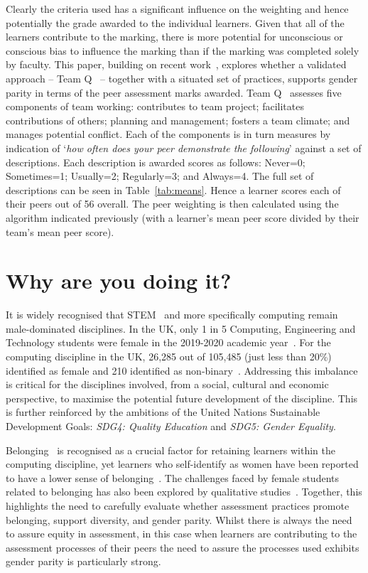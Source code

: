 \documentclass[sigconf, anonymous=false]{acmart}
\begin{document}
Clearly the criteria used has a significant influence on the weighting
and hence potentially the grade awarded to the individual
learners. Given that all of the learners contribute to the marking,
there is more potential for unconscious or conscious bias to influence
the marking than if the marking was completed solely by faculty. This
paper, building on recent
work~\cite{crick-et-alassessposter:sigcse2022}, explores whether a
validated approach -- Team Q~\cite{Britton2017} -- together with a
situated set of practices, supports gender parity in terms of the peer
assessment marks awarded.  Team Q~\cite{Britton2017} assesses five
components of team working: contributes to team project; facilitates
contributions of others; planning and management; fosters a team
climate; and manages potential conflict. Each of the components is in
turn measures by indication of `{\emph{how often does your peer
demonstrate the following}}' against a set of descriptions. Each
description is awarded scores as follows: Never=0; Sometimes=1;
Usually=2; Regularly=3; and Always=4. The full set of descriptions can
be seen in Table~\ref{tab:means}. Hence a learner scores each of their
peers out of 56 overall. The peer weighting is then calculated using
the algorithm indicated previously (with a learner's mean peer score
divided by their team's mean peer score).

\vspace{-0.5em}
\section{Why are you doing it?}
It is widely recognised that STEM~\cite{Baird2018} and more
specifically computing remain male-dominated disciplines. In the UK,
only 1 in 5 Computing, Engineering and Technology students were female
in the 2019-2020 academic year~\cite{HESA}. For the computing
discipline in the UK, 26,285 out of 105,485 (just less than 20\%)
identified as female and 210 identified as
non-binary~\cite{HESA}. Addressing this imbalance is critical for the
disciplines involved, from a social, cultural and economic
perspective, to maximise the potential future development of the
discipline. This is further reinforced by the ambitions of the United
Nations Sustainable Development Goals: {\emph{SDG4: Quality
Education}} and {\emph{SDG5: Gender Equality}}.

Belonging~\cite{Veilleux2013} is recognised as a crucial factor for
retaining learners within the computing discipline, yet learners who
self-identify as women have been reported to have a lower sense of
belonging~\cite{Mooney2020}. The challenges faced by female students
related to belonging has also been explored by qualitative
studies~\cite{Winter2021}. Together, this highlights the need to
carefully evaluate whether assessment practices promote belonging,
support diversity, and gender parity. Whilst there is always the need
to assure equity in assessment, in this case when learners are
contributing to the assessment processes of their peers the need to
assure the processes used exhibits gender parity is particularly
strong.
\end{document}
